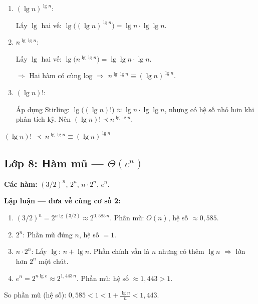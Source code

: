 ﻿\documentclass[12pt,a4paper]{article}
\begin{document}
\begin{enumerate}[label=(\roman*)]
  \item $(\lg n)^{\lg n}$:

  Lấy $\lg$ hai vế: $\lg\bigl((\lg n)^{\lg n}\bigr) = \lg n \cdot \lg\lg n$.

  \item $n^{\lg\lg n}$:

  Lấy $\lg$ hai vế: $\lg\bigl(n^{\lg\lg n}\bigr) = \lg\lg n \cdot \lg n$.

  $\Longrightarrow$ Hai hàm có cùng log $\Rightarrow$ $n^{\lg\lg n} \equiv (\lg n)^{\lg n}$.

  \item $(\lg n)!$:

  Áp dụng Stirling: $\lg\bigl((\lg n)!\bigr) \approx \lg n \cdot \lg\lg n$, nhưng có hệ số nhỏ hơn
  khi phân tích kỹ. Nên $(\lg n)! \prec n^{\lg\lg n}$.
\end{enumerate}

\begin{resultbox}
$(\lg n)! \;\prec\; n^{\lg\lg n} \equiv (\lg n)^{\lg n}$
\end{resultbox}

\subsection{Lớp 8: Hàm mũ --- $\Theta(c^n)$}

\textbf{Các hàm:} $(3/2)^n$, \;\; $2^n$, \;\; $n \cdot 2^n$, \;\; $e^n$.

\textbf{Lập luận --- đưa về cùng cơ số 2:}

\begin{enumerate}[label=(\roman*)]
  \item $(3/2)^n = 2^{n\lg(3/2)} \approx 2^{0{,}585\,n}$. Phần mũ: $O(n)$, hệ số $\approx 0{,}585$.

  \item $2^n$: Phần mũ đúng $n$, hệ số $= 1$.

  \item $n \cdot 2^n$: Lấy $\lg$: $n + \lg n$. Phần chính vẫn là $n$ nhưng có thêm $\lg n$ $\Rightarrow$ lớn hơn $2^n$ một chút.

  \item $e^n = 2^{n\lg e} \approx 2^{1{,}443\,n}$. Phần mũ: hệ số $\approx 1{,}443 > 1$.
\end{enumerate}

So phần mũ (hệ số): $0{,}585 < 1 < 1 + \frac{\lg n}{n} < 1{,}443$.
\end{document}
